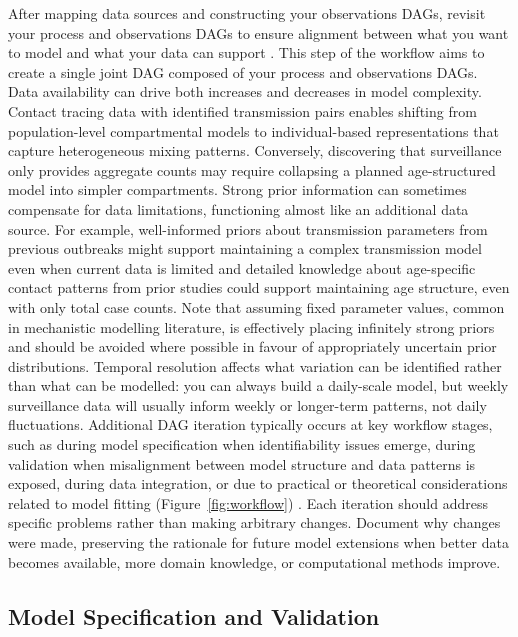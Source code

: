 \documentclass{article}
\begin{document}
After mapping data sources and constructing your observations DAGs, revisit your process and observations DAGs to ensure alignment between what you want to model and what your data can support \citep{gelman2020bayesian}.
This step of the workflow aims to create a single joint DAG composed of your process and observations DAGs.
Data availability can drive both increases and decreases in model complexity.
Contact tracing data with identified transmission pairs enables shifting from population-level compartmental models to individual-based representations that capture heterogeneous mixing patterns.
Conversely, discovering that surveillance only provides aggregate counts may require collapsing a planned age-structured model into simpler compartments.
Strong prior information can sometimes compensate for data limitations, functioning almost like an additional data source.
For example, well-informed priors about transmission parameters from previous outbreaks might support maintaining a complex transmission model even when current data is limited and detailed knowledge about age-specific contact patterns from prior studies could support maintaining age structure, even with only total case counts.
Note that assuming fixed parameter values, common in mechanistic modelling literature, is effectively placing infinitely strong priors and should be avoided where possible in favour of appropriately uncertain prior distributions.
Temporal resolution affects what variation can be identified rather than what can be modelled: you can always build a daily-scale model, but weekly surveillance data will usually inform weekly or longer-term patterns, not daily fluctuations.
Additional DAG iteration typically occurs at key workflow stages, such as during model specification when identifiability issues emerge, during validation when misalignment between model structure and data patterns is exposed, during data integration, or due to practical or theoretical considerations related to model fitting (Figure~\ref{fig:workflow}) \citep{corbella2022inferring}.
Each iteration should address specific problems rather than making arbitrary changes.
Document why changes were made, preserving the rationale for future model extensions when better data becomes available,  more domain knowledge, or computational methods improve.

\subsection{Model Specification and Validation}\label{sec:spec-validate}
\end{document}
